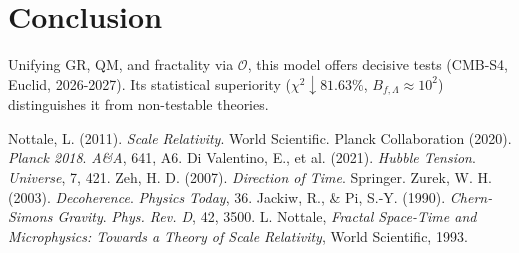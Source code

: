 \documentclass[aps,prl,twocolumn,groupedaddress]{revtex4-2}
\newcommand{\Opp}{\mathcal{O}}
\begin{document}
\section{Conclusion}
Unifying GR, QM, and fractality via \(\Opp\), this model offers decisive tests (CMB-S4, Euclid, 2026-2027). Its statistical superiority (\(\chi^2 \downarrow 81.63\%\), \(B_{f,\Lambda} \approx 10^2\)) distinguishes it from non-testable theories.

\begin{thebibliography}{9}
 Nottale, L. (2011). \textit{Scale Relativity}. World Scientific.
 Planck Collaboration (2020). \textit{Planck 2018}. \textit{A\&A}, 641, A6.
 Di Valentino, E., et al. (2021). \textit{Hubble Tension}. \textit{Universe}, 7, 421.
 Zeh, H. D. (2007). \textit{Direction of Time}. Springer.
 Zurek, W. H. (2003). \textit{Decoherence}. \textit{Physics Today}, 36.
 Jackiw, R., & Pi, S.-Y. (1990). \textit{Chern-Simons Gravity}. \textit{Phys. Rev. D}, 42, 3500.
 L. Nottale, \textit{Fractal Space-Time and Microphysics: Towards a Theory of Scale Relativity}, World Scientific, 1993.
\end{thebibliography}
\end{document}
